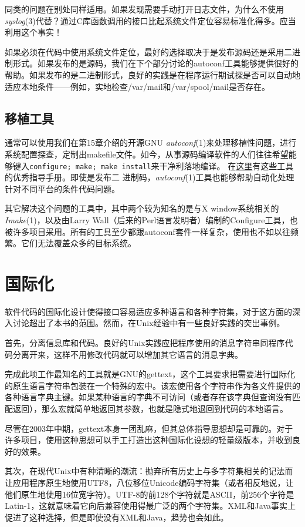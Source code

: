 \documentclass[12pt,oneside]{ctexbook}
\begin{document}
\begin{common-format}
同类的问题在别处同样适用。如果发现需要手动打开日志文件，为什么不使用\textit{syslog}(3)代替？通过C库函数调用的接口比起系统文件定位容易标准化得多。应当利用这个事实！

如果必须在代码中使用系统文件定位，最好的选择取决于是发布源码还是采用二进制形式。如果发布的是源码，我们在下个部分讨论的autoconf工具能够提供很好的帮助。如果发布的是二进制形式，良好的实践是在程序运行期试探是否可以自动地适应本地条件——例如，实地检查/var/mail和/var/spool/mail是否存在。

\subsection{移植工具}
通常可以使用我们在第15章介绍的开源GNU \textit{autoconf}(1)来处理移植性问题，进行系统配置探查，定制出makefile文件。如今，从事源码编译软件的人们往往希望能够键入\verb+configure; make; make install+来干净利落地编译。  在\href{http://seul.org/docs/autotut/}{这里}有这些工具的优秀指导手册。即使是发布二
进制码，\textit{autoconf}(1)工具也能够帮助自动化处理针对不同平台的条件代码问题。

其它解决这个问题的工具中，其中两个较为知名的是与X window系统相关的\textit{Imake}(1)，以及由Larry Wall（后来的Perl语言发明者）编制的Configure工具，也被许多项目采用。所有的工具至少都跟autoconf套件一样复杂，使用也不如以往频繁。它们无法覆盖众多的目标系统。

\section{国际化}
软件代码的国际化设计使得接口容易适应多种语言和各种字符集，对于这方面的深入讨论超出了本书的范围。然而，在Unix经验中有一些良好实践的突出事例。

首先，分离信息库和代码。良好的Unix实践应把程序使用的消息字符串同程序代码分离开来，这样不用修改代码就可以增加其它语言的消息字典。

完成此项工作最知名的工具就是GNU的gettext，这个工具要求把需要进行国际化的原生语言字符串包装在一个特殊的宏中。该宏使用各个字符串作为各文件提供的各种语言字典主键。如果某种语言的字典不可访问（或者存在该字典但查询没有匹配返回），那么宏就简单地返回其参数，也就是隐式地退回到代码的本地语言。

尽管在2003年中期，gettext本身一团乱麻，但其总体指导思想却是可靠的。对于许多项目，使用这种思想可以手工打造出这种国际化设想的轻量级版本，并收到良好的效果。

其次，在现代Unix中有种清晰的潮流：抛弃所有历史上与多字符集相关的记法而让应用程序原生地使用UTF8，八位移位Unicode编码字符集（或者相反地说，让他们原生地使用16位宽字符）。UTF-8的前128个字符就是ASCII，前256个字符是Latin-1，这就意味着它向后兼容使用得最广泛的两个字符集。XML和Java事实上促进了这种选择，但是即使没有XML和Java，趋势也会如此。


\end{common-format}
\end{document}
